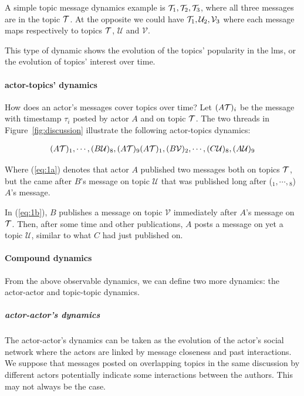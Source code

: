 \documentclass[a4paper,twoside]{article}
\newcommand{\V}{\mathcal{V}}
\newcommand{\U}{\mathcal{U}}
\begin{document}
A simple topic message dynamics example is  $\mathcal{T}_1, \mathcal{T}_2, \mathcal{T}_3$,  where all three messages are in the topic $\mathcal{T}$.  At the opposite we could have $\T_1, \U_2, \V_3$ where each message maps respectively to topics $\mathcal{T}$, $\U$ and $\V$.

This type of dynamic shows the evolution of the topics' popularity in the \gls{lms}, or the evolution of topics' interest over time.


\paragraph{actor-topics' dynamics}
How does an actor's messages cover topics over time?  Let $(A\mathcal{T})_i$ be the message with timestamp $\tau_i$ posted by actor $A$ and on topic $\mathcal{T}$.  The two threads in Figure~\ref{fig:discussion} illustrate the following actor-topics dynamics:


\begin{subequations}
  \begin{align}
    \label{eq:1a}
    (A\T)_1, \cdots{}, (B\U)_8, (A\T)_9
  \end{align}
  \begin{align}
    \label{eq:1b}
    (A\T)_1, (B\V)_2, \cdots{},  (C\U)_8, (A\U)_9
  \end{align}
\end{subequations}

Where (\ref{eq:1a}) denotes that actor $A$ published two messages both on topics $\mathcal{T}$, but the  came after $B$'s message on topic $\U$ that was published long after (${}_1,\cdots, {}_8$) $A$'s  message.

In (\ref{eq:1b}), $B$ publishes a message on topic $\V$ immediately after $A$'s message on $\mathcal{T}$.  Then, after some time and other publications, $A$ posts a message on yet a  topic $\U$, similar to what $C$ had just published on.


\paragraph{Compound dynamics}
From the above observable dynamics, we can define two more dynamics: the actor-actor and topic-topic dynamics.

\subparagraph{actor-actor's dynamics}

The actor-actor's dynamics can be taken as the evolution of the actor's social network where the actors are linked by message closeness and past interactions. We suppose that messages posted on overlapping topics in the same discussion by different actors potentially indicate some interactions between the authors.   This may not always be the case.
\end{document}
